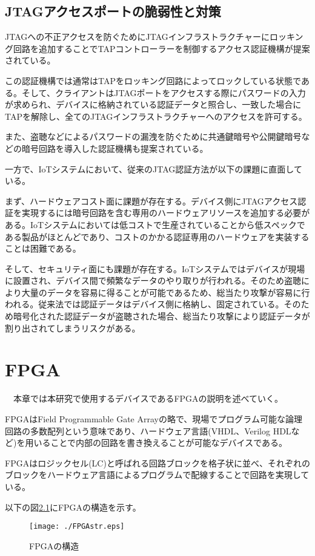\documentclass{thesis}
\begin{document}
\section{JTAGアクセスポートの脆弱性と対策}
JTAGへの不正アクセスを防ぐためにJTAGインフラストラクチャーにロッキング回路を追加することでTAPコントローラーを制御するアクセス認証機構が提案されている。\par
この認証機構では通常はTAPをロッキング回路によってロックしている状態である。そして、クライアントはJTAGポートをアクセスする際にパスワードの入力が求められ、デバイスに格納されている認証データと照合し、一致した場合にTAPを解除し、全てのJTAGインフラストラクチャーへのアクセスを許可する。\par
また、盗聴などによるパスワードの漏洩を防ぐために共通鍵暗号や公開鍵暗号などの暗号回路を導入した認証機構も提案されている。\par
一方で、IoTシステムにおいて、従来のJTAG認証方法が以下の課題に直面している。\par
まず、ハードウェアコスト面に課題が存在する。デバイス側にJTAGアクセス認証を実現するには暗号回路を含む専用のハードウェアリソースを追加する必要がある。IoTシステムにおいては低コストで生産されていることから低スペックである製品がほとんどであり、コストのかかる認証専用のハードウェアを実装することは困難である。\par
そして、セキュリティ面にも課題が存在する。IoTシステムではデバイスが現場に設置され、デバイス間で頻繁なデータのやり取りが行われる。そのため盗聴により大量のデータを容易に得ることが可能であるため、総当たり攻撃が容易に行われる。従来法では認証データはデバイス側に格納し、固定されている。そのため暗号化された認証データが盗聴された場合、総当たり攻撃により認証データが割り出されてしまうリスクがある。\cite{JTAG認証機構}

\chapter{FPGA}
　本章では本研究で使用するデバイスであるFPGAの説明を述べていく。\par
FPGAはField Programmable Gate Arrayの略で、現場でプログラム可能な論理回路の多数配列という意味であり、ハードウェア言語(VHDL、Verilog HDLなど)を用いることで内部の回路を書き換えることが可能なデバイスである。\par
FPGAはロジックセル(LC)と呼ばれる回路ブロックを格子状に並べ、それぞれのブロックをハードウェア言語によるプログラムで配線することで回路を実現している。\par
以下の図\ref{FPGAstr}にFPGAの構造を示す。
\begin{figure}[H]
 \center
 \texttt{[image: ./FPGAstr.eps]}
 \caption{FPGAの構造}
 \label{FPGAstr}
\end{figure}
\end{document}
